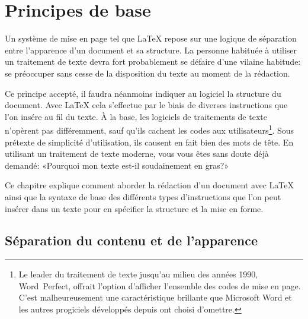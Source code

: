 \chapter{Principes de base}
\label{chap:bases}

Un système de mise en page tel que {\LaTeX} repose sur une logique de
séparation entre l'apparence d'un document et sa structure. La
personne habituée à utiliser un traitement de texte devra fort
probablement se défaire d'une vilaine habitude: se préoccuper sans
cesse de la disposition du texte au moment de la rédaction.

Ce principe accepté, il faudra néanmoins indiquer au logiciel la
structure du document. Avec {\LaTeX} cela s'effectue par le biais de
diverses instructions que l'on insére au fil du texte. À la base, les
logiciels de traitements de texte n'opèrent pas différemment, sauf
qu'ils cachent les codes aux utilisateurs\footnote{%
  Le leader du traitement de texte jusqu'au milieu des années 1990,
  Word~Perfect, offrait l'option d'afficher l'ensemble des codes de
  mise en page. C'est malheureusement une caractéristique brillante
  que Microsoft Word et les autres progiciels développés depuis ont
  choisi d'omettre.}. %
Sous prétexte de simplicité d'utilisation, ils causent en fait bien
des mots de tête. En utilisant un traitement de texte moderne, vous
vous êtes sans doute déjà demandé: «Pourquoi mon texte est-il
soudainement en gras?»

Ce chapitre explique comment aborder la rédaction d'un document avec
{\LaTeX} ainsi que la syntaxe de base des différents types
d'instructions que l'on peut insérer dans un texte pour en spécifier
la structure et la mise en forme.


\section{Séparation du contenu et de l'apparence}
\label{sec:bases:separation}

